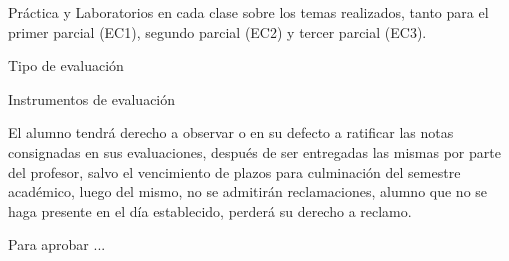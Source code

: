 \documentclass[a4paper,8pt]{article}
\begin{document}
\begin{estrategiasEvaluacion}
    \begin{evaluacionContinua}
        Práctica y Laboratorios en cada clase sobre los temas realizados, tanto para el primer parcial (EC1), segundo parcial (EC2) y tercer parcial (EC3).
    \end{evaluacionContinua}
    \begin{evaluacionPeriodica}
    \end{evaluacionPeriodica}
    \begin{cronogramaEvaluacion}
    \end{cronogramaEvaluacion}
    \begin{tipoEvaluacion}
        Tipo de evaluación
    \end{tipoEvaluacion}
    \begin{instrumentosEvaluacion}
        Instrumentos de evaluación
    \end{instrumentosEvaluacion}
\end{estrategiasEvaluacion}

\begin{requisitosAprobacion}
\item El alumno tendrá derecho a observar o en su defecto a ratificar las notas consignadas en sus evaluaciones, después de ser entregadas las mismas por parte del profesor, salvo el vencimiento de plazos para culminación del semestre académico, luego del mismo, no se admitirán reclamaciones,
alumno que no se haga presente en el día establecido, perderá su derecho a reclamo.
\item Para aprobar ...
\end{requisitosAprobacion}




\fecha
\firma
\end{document}
